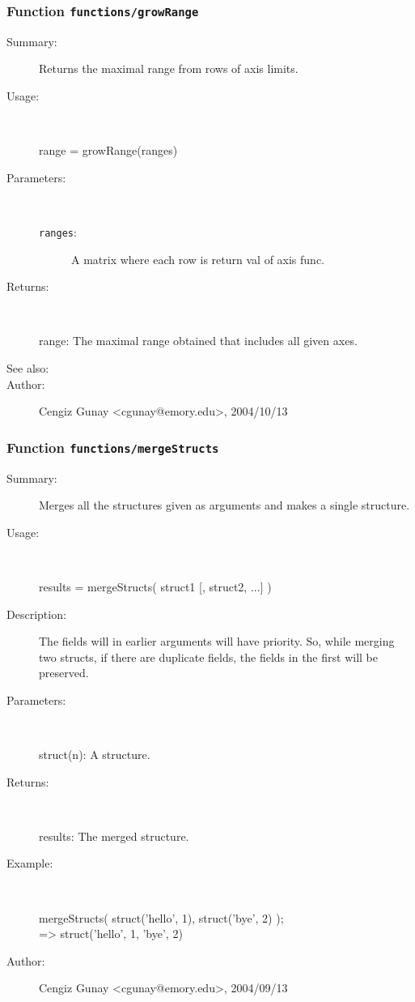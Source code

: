 \subsubsection[Function \texttt{growRange}]{Function \texttt{functions/growRange}}%
%
\label{ref_functions__growRange}%
\hypertarget{ref_functions__growRange}{}%
\begin{description}
\item[Summary:]Returns the maximal range from rows of axis limits. 
%
\item[Usage:]~%
\begin{lyxcode}%
range = growRange(ranges)
%
\end{lyxcode}%
%
%
\item[Parameters:]~
\begin{description}%
\item[\texttt{ranges}:]
 A matrix where each row is return val of axis func.
\end{description}%
%
\item[Returns:]~

	range: The maximal range obtained that includes all given axes.
%
%
\item[See also:]%
%
\item[Author:]%
Cengiz Gunay <cgunay@emory.edu>, 2004/10/13%
\end{description}
\methodline%
\subsubsection[Function \texttt{mergeStructs}]{Function \texttt{functions/mergeStructs}}%
%
\label{ref_functions__mergeStructs}%
\hypertarget{ref_functions__mergeStructs}{}%
\begin{description}
\item[Summary:]Merges all the structures given as arguments and makes a single structure.
%
\item[Usage:]~%
\begin{lyxcode}%
results = mergeStructs( struct1 [, struct2, ...] )
%
\end{lyxcode}%
%
\item[Description:]%
The fields will in earlier arguments will have priority. So, while merging two
 structs, if there are duplicate fields, the fields in the first will be preserved.
\item[Parameters:]~

struct(n): A structure.%
\item[Returns:]~

 	results: The merged structure.
%
\item[Example:]~
\begin{lyxcode} mergeStructs( struct('hello', 1), struct('bye', 2) );\\%
  => struct('hello', 1, 'bye', 2)\\%
\end{lyxcode}
%
%
\item[Author:]%
Cengiz Gunay <cgunay@emory.edu>, 2004/09/13%
\end{description}
\methodline%
